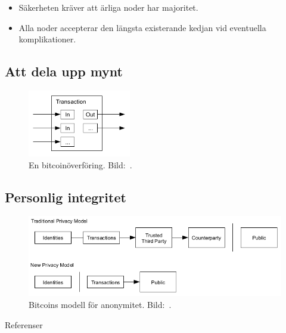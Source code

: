 \documentclass{beamer}
\begin{document}
\begin{frame}{\insertsubsectionhead}
  \begin{itemize}
    \item Säkerheten kräver att ärliga noder har majoritet.
    \item Alla noder accepterar den längsta existerande kedjan vid eventuella 
      komplikationer.
  \end{itemize}
\end{frame}


\subsection{Att dela upp mynt}

\begin{frame}{\insertsubsectionhead}
  \begin{figure}
    \includegraphics[width=0.4\textwidth]{bitcoin-transaction.png}
    \caption{En bitcoinöverföring.
    Bild:~\cite{Nakamoto2008bap}.}
  \end{figure}
\end{frame}

\subsection{Personlig integritet}

\begin{frame}{\insertsubsectionhead}
  \begin{figure}
    \includegraphics[width=\textwidth]{bitcoin-privacy.png}
    \caption{Bitcoins modell för anonymitet.
    Bild:~\cite{Nakamoto2008bap}.}
  \end{figure}
\end{frame}



\begin{frame}[allowframebreaks]{Referenser}
	\small
  \printbibliography{}
\end{frame}
\end{document}
